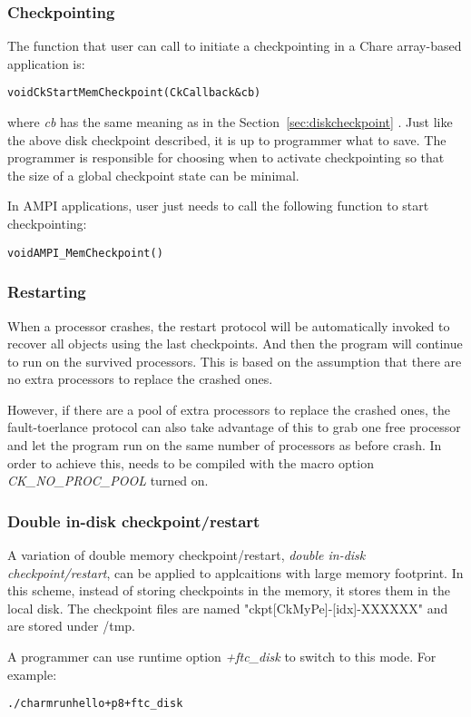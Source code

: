 \subsubsection{Checkpointing}

The function that user can call to initiate a checkpointing in a Chare 
array-based application is: 

\begin{alltt}
      void CkStartMemCheckpoint(CkCallback &cb)
\end{alltt}

where {\it cb} has the same meaning as in the Section~\ref{sec:diskcheckpoint} .
Just like the above disk checkpoint described, it is up to programmer what to save.
The programmer is responsible for choosing when to activate checkpointing so that
the size of a global checkpoint state can be minimal.

In AMPI applications, user just needs to call the following function to 
start checkpointing:

\begin{alltt}
      void AMPI_MemCheckpoint()
\end{alltt}

\subsubsection{Restarting}

When a processor crashes, the restart protocol will be automatically
invoked to recover all objects using the last checkpoints. And then the program
will continue to run on the survived processors. This is based on the assumption
that there are no extra processors to replace the crashed ones. 

However, if there are a pool of extra processors to replace the crashed ones, 
the fault-toerlance protocol can also take advantage of this to grab one
free processor and let the program run on the same number of processors 
as before crash. 
In order to achieve this, \charmpp{} needs to be compiled with the macro option
 {\it CK\_NO\_PROC\_POOL} turned on.


\subsubsection{Double in-disk checkpoint/restart}

A variation of double memory checkpoint/restart,
{\it double in-disk checkpoint/restart},
can be applied to applcaitions with large memory footprint.
In this scheme, instead of storing checkpoints in the memory, it stores 
them in the local disk.
The checkpoint files are named "ckpt[CkMyPe]-[idx]-XXXXXX" and are stored under /tmp.

A programmer can use runtime option {\it +ftc\_disk} to switch to this mode.
For example:

\begin{alltt}
   ./charmrun hello +p8 +ftc_disk
\end{alltt} 


